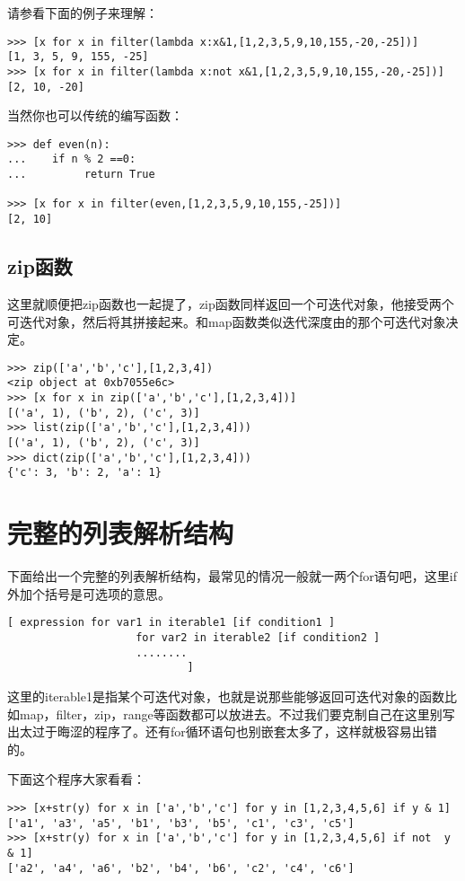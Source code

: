 \documentclass[12pt,oneside]{book}
\begin{document}
\begin{common-format}
请参看下面的例子来理解：
\begin{Verbatim}
>>> [x for x in filter(lambda x:x&1,[1,2,3,5,9,10,155,-20,-25])]
[1, 3, 5, 9, 155, -25]
>>> [x for x in filter(lambda x:not x&1,[1,2,3,5,9,10,155,-20,-25])]
[2, 10, -20]
\end{Verbatim}


当然你也可以传统的编写函数：
\begin{Verbatim}
>>> def even(n):
...    if n % 2 ==0:
...         return True

>>> [x for x in filter(even,[1,2,3,5,9,10,155,-25])]
[2, 10]
\end{Verbatim}

\subsection{zip函数}
这里就顺便把zip函数也一起提了，zip函数同样返回一个可迭代对象，他接受两个可迭代对象，然后将其拼接起来。和map函数类似迭代深度由的那个可迭代对象决定。
\begin{Verbatim}
>>> zip(['a','b','c'],[1,2,3,4])
<zip object at 0xb7055e6c>
>>> [x for x in zip(['a','b','c'],[1,2,3,4])]
[('a', 1), ('b', 2), ('c', 3)]
>>> list(zip(['a','b','c'],[1,2,3,4]))
[('a', 1), ('b', 2), ('c', 3)]
>>> dict(zip(['a','b','c'],[1,2,3,4]))
{'c': 3, 'b': 2, 'a': 1}
\end{Verbatim}


\section{完整的列表解析结构}
下面给出一个完整的列表解析结构，最常见的情况一般就一两个for语句吧，这里if外加个括号是可选项的意思。
\begin{Verbatim}
[ expression for var1 in iterable1 [if condition1 ]
                    for var2 in iterable2 [if condition2 ]
                    ........
                            ]
\end{Verbatim}

这里的iterable1是指某个可迭代对象，也就是说那些能够返回可迭代对象的函数比如map，filter，zip，range等函数都可以放进去。不过我们要克制自己在这里别写出太过于晦涩的程序了。还有for循环语句也别嵌套太多了，这样就极容易出错的。

下面这个程序大家看看：
\begin{Verbatim}
>>> [x+str(y) for x in ['a','b','c'] for y in [1,2,3,4,5,6] if y & 1]
['a1', 'a3', 'a5', 'b1', 'b3', 'b5', 'c1', 'c3', 'c5']
>>> [x+str(y) for x in ['a','b','c'] for y in [1,2,3,4,5,6] if not  y & 1]
['a2', 'a4', 'a6', 'b2', 'b4', 'b6', 'c2', 'c4', 'c6']
\end{Verbatim}


\end{common-format}
\end{document}

